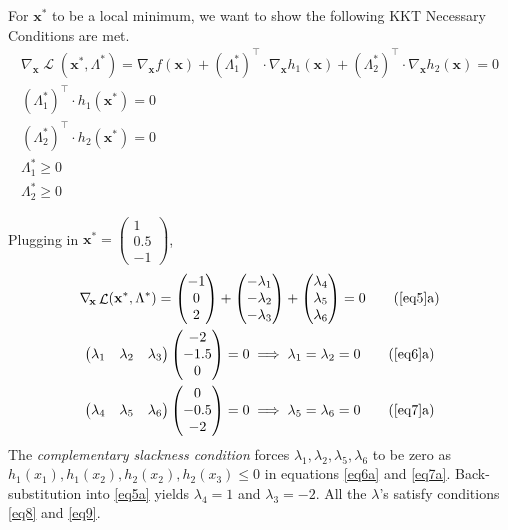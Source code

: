 \documentclass[fleqn]{article}
\newcommand{\mat}[1]{\mathbf{#1}}
\newcommand{\tr}{^\intercal}
\newcommand{\vect}[1]{\begin{pmatrix}#1\end{pmatrix}}
\newcommand{\nablax}{\nabla_{\!\mat x}}
\DeclareMathOperator{\Lagr}{\mathcal{L}}
\begin{document}
For $\mat x^*$ to be a local minimum, we want to show
the following KKT Necessary Conditions are met.
\begin{gather}
\nablax \Lagr(\mat x^*, \Lambda^*) = 
  \nablax f(\mat x) + (\Lambda_1^*)\tr\cdot\nablax h_1(\mat x)
  + (\Lambda_2^*)\tr\cdot\nablax h_2(\mat x) = 0 \label{eq5}\\
(\Lambda_1^*)\tr \cdot h_1(\mat x^*) = 0 \label{eq6}\\
(\Lambda_2^*)\tr \cdot h_2(\mat x^*) = 0 \label{eq7}\\
\Lambda_1^* \geq 0 \label{eq8}\\
\Lambda_2^* \geq 0 \label{eq9}
\end{gather}

Plugging in $\mat x^* = \vect{1 \\ 0.5 \\ -1}$,\enskip
\begin{gather}
\nabla_{\!\mat x} \Lagr(\mat x^*, \Lambda^*) = \vect{-1\\0\\2}
  +\vect{-\lambda_1\\-\lambda_2\\-\lambda_3}
  +\vect{\lambda_4\\ \lambda_5\\ \lambda_6}=0 \tag{\ref{eq5}a}\label{eq5a}\\
\vect{\lambda_1&\lambda_2&\lambda_3} \vect{-2\\-1.5\\0} = 0
  \implies \lambda_1=\lambda_2=0 \tag{\ref{eq6}a}\label{eq6a}\\
\vect{\lambda_4&\lambda_5&\lambda_6} \vect{0\\-0.5\\-2} = 0
  \implies \lambda_5=\lambda_6=0 \tag{\ref{eq7}a}\label{eq7a}
\end{gather}
The \emph{complementary slackness condition} forces
$\lambda_1,\lambda_2,\lambda_5,\lambda_6$ to be zero as
$h_1(x_1), h_1(x_2), h_2(x_2), h_2(x_3) \leq 0$ in
equations \eqref{eq6a} and \eqref{eq7a}.
Back-substitution into \eqref{eq5a} yields $\lambda_4=1$ and 
$\lambda_3=-2$. All the $\lambda$'s satisfy conditions \eqref{eq8}
and \eqref{eq9}.
\end{document}
